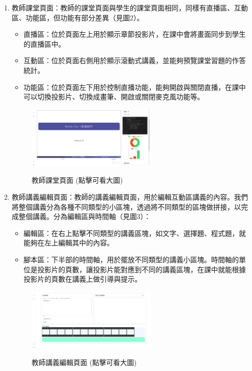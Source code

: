 \documentclass[12pt]{article}
\begin{document}
\begin{enumerate}[label=(\arabic*)]
  \item 教師課堂頁面：教師的課堂頁面與學生的課堂頁面相同，同樣有直播區、互動區、功能區，但功能有部分差異（見圖2）。
    \begin{itemize}
      \item 直播區：位於頁面左上用於顯示章節投影片，在課中會將畫面同步到學生的直播區中。
      \item 互動區：位於頁面右側用於顯示滾動式講義，並能夠預覽課堂習題的作答統計。
      \item 功能區：位於頁面左下用於控制直播功能，能夠開啟與關閉直播，在課中可以切換投影片、切換成畫筆、開啟或關閉麥克風功能等。
    \end{itemize}
  
    \begin{figure}[H]
      \centering
      \href{https://raw.githubusercontent.com/programingtw/proglearn-plan/main/2023全國大專校院智慧創新暨跨域整合創作競賽/img/teacher.png}{
        \includegraphics[width=0.60\textwidth]{./img/teacher.png}
      }
      \caption{教師課堂頁面 (點擊可看大圖)}
      \label{arc3}
    \end{figure}
  
  \item 教師講義編輯頁面：教師的講義編輯頁面，用於編輯互動區講義的內容。我們將整個講義分為各種不同類型的小區塊，透過將不同類型的區塊做拼接，以完成整個講義。分為編輯區與時間軸（見圖3）：
    \begin{itemize}
      \item 編輯區：在右上點擊不同類型的講義區塊，如文字、選擇題、程式題，就能夠在左上編輯其中的內容。
      \item 腳本區：下半部的時間軸，用於擺放不同類型的講義小區塊。時間軸的單位是投影片的頁數，讓投影片能對應到不同的講義區塊，在課中就能根據投影片的頁數在講義上做引導與提示。
    \end{itemize}

    \begin{figure}[H]
      \centering
      \href{https://raw.githubusercontent.com/programingtw/proglearn-plan/main/2023全國大專校院智慧創新暨跨域整合創作競賽/img/teacher2.png}{
        \includegraphics[width=0.60\textwidth]{./img/teacher2.png}
      }
      \caption{教師講義編輯頁面 (點擊可看大圖)}
      \label{arc4}
    \end{figure}
\end{enumerate}
\end{document}
